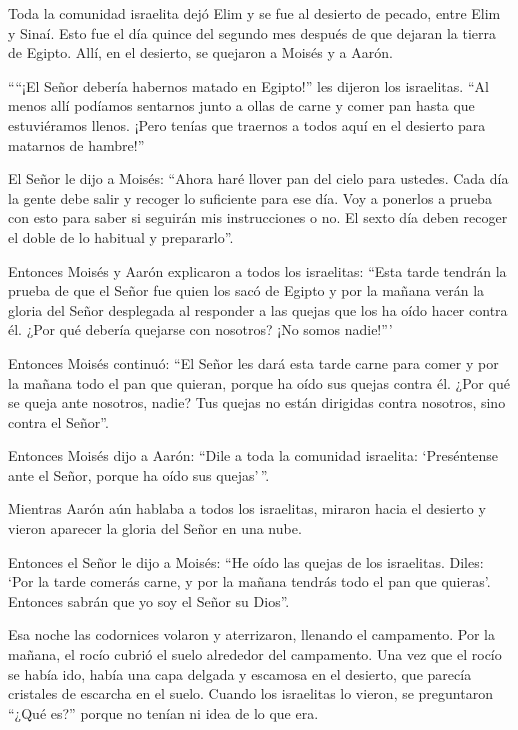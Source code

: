  Toda la comunidad israelita dejó Elim y se fue al desierto
de pecado, entre Elim y Sinaí. Esto fue el día quince del segundo mes
después de que dejaran la tierra de Egipto.  Allí, en el
desierto, se quejaron a Moisés y a Aarón.

 ````¡El Señor debería habernos matado en Egipto!'' les
dijeron los israelitas. ``Al menos allí podíamos sentarnos junto a ollas
de carne y comer pan hasta que estuviéramos llenos. ¡Pero tenías que
traernos a todos aquí en el desierto para matarnos de hambre!''

 El Señor le dijo a Moisés: ``Ahora haré llover pan del
cielo para ustedes. Cada día la gente debe salir y recoger lo suficiente
para ese día. Voy a ponerlos a prueba con esto para saber si seguirán
mis instrucciones o no.  El sexto día deben recoger el doble
de lo habitual y prepararlo''.

 Entonces Moisés y Aarón explicaron a todos los israelitas:
``Esta tarde tendrán la prueba de que el Señor fue quien los sacó de
Egipto  y por la mañana verán la gloria del Señor desplegada
al responder a las quejas que los ha oído hacer contra él. ¿Por qué
debería quejarse con nosotros? ¡No somos nadie!'''

 Entonces Moisés continuó: ``El Señor les dará esta tarde
carne para comer y por la mañana todo el pan que quieran, porque ha oído
sus quejas contra él. ¿Por qué se queja ante nosotros, nadie? Tus quejas
no están dirigidas contra nosotros, sino contra el Señor''.

 Entonces Moisés dijo a Aarón: ``Dile a toda la comunidad
israelita: `Preséntense ante el Señor, porque ha oído sus quejas'\,''.

 Mientras Aarón aún hablaba a todos los israelitas, miraron
hacia el desierto y vieron aparecer la gloria del Señor en una nube.

 Entonces el Señor le dijo a Moisés:  ``He
oído las quejas de los israelitas. Diles: `Por la tarde comerás carne, y
por la mañana tendrás todo el pan que quieras'. Entonces sabrán que yo
soy el Señor su Dios''.

 Esa noche las codornices volaron y aterrizaron, llenando
el campamento. Por la mañana, el rocío cubrió el suelo alrededor del
campamento.  Una vez que el rocío se había ido, había una
capa delgada y escamosa en el desierto, que parecía cristales de
escarcha en el suelo.  Cuando los israelitas lo vieron, se
preguntaron ``¿Qué es?'' porque no tenían ni idea de lo que era.

